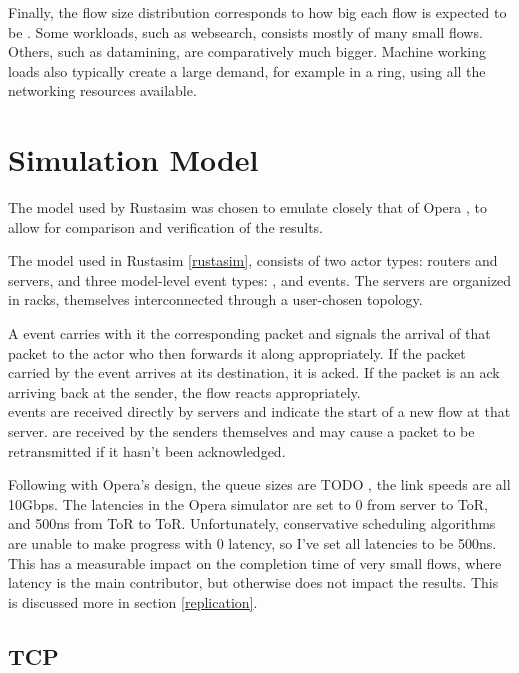 Finally, the flow size distribution corresponds to how big each flow is expected to be \cite{alizadeh_data_2010} .
Some workloads, such as websearch, consists mostly of many small flows.
Others, such as datamining, are comparatively much bigger.
Machine working loads also typically create a large demand, for example in a ring, using all the networking resources available.

\section{Simulation Model} \label{model-sim}

The \datacenter model used by Rustasim was chosen to emulate closely that of Opera , to allow for comparison and verification of the results.

The model used in Rustasim \ref{rustasim}, consists of two actor types: routers and servers, and three model-level event types: ,  and  events.
The servers are organized in racks, themselves interconnected through a user-chosen topology.

A  event carries with it the corresponding packet and signals the arrival of that packet to the actor who then forwards it along appropriately.
If the packet carried by the event arrives at its destination, it is acked. 
If the packet is an ack arriving back at the sender, the flow reacts appropriately.\\

 events are received directly by servers and indicate the start of a new flow at that server.
 are received by the senders themselves and may cause a packet to be retransmitted if it hasn't been acknowledged.

Following with Opera's design, the queue sizes are TODO , the link speeds are all 10Gbps.
The latencies in the Opera simulator are set to 0 from server to ToR, and 500ns from ToR to ToR.
Unfortunately, conservative scheduling algorithms are unable to make progress with 0 latency, so I've set all latencies to be 500ns.
This has a measurable impact on the completion time of very small flows, where latency is the main contributor, but otherwise does not impact the results.
This is discussed more in section \ref{replication}.


\subsection{TCP} \label{model-tcp}

